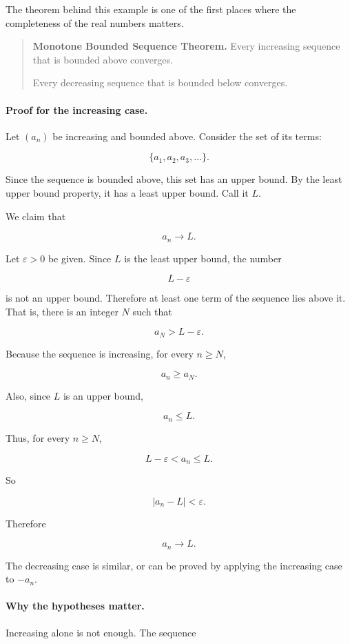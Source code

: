 The theorem behind this example is one of the first places where the completeness of the real numbers matters.

\begin{quote}
\textbf{Monotone Bounded Sequence Theorem.}
Every increasing sequence that is bounded above converges.

Every decreasing sequence that is bounded below converges.
\end{quote}

\paragraph{Proof for the increasing case.}
Let \((a_n)\) be increasing and bounded above.  Consider the set of its terms:

\[
\{a_1,a_2,a_3,\ldots\}.
\]

Since the sequence is bounded above, this set has an upper bound.  By the least upper bound property, it has a least upper bound.  Call it \(L\).

We claim that

\[
a_n\to L.
\]

Let \(\varepsilon>0\) be given.  Since \(L\) is the least upper bound, the number

\[
L-\varepsilon
\]

is not an upper bound.  Therefore at least one term of the sequence lies above it.  That is, there is an integer \(N\) such that

\[
a_N>L-\varepsilon.
\]

Because the sequence is increasing, for every \(n\ge N\),

\[
a_n\ge a_N.
\]

Also, since \(L\) is an upper bound,

\[
a_n\le L.
\]

Thus, for every \(n\ge N\),

\[
L-\varepsilon<a_n\le L.
\]

So

\[
|a_n-L|<\varepsilon.
\]

Therefore

\[
a_n\to L.
\]

The decreasing case is similar, or can be proved by applying the increasing case to \(-a_n\).

\paragraph{Why the hypotheses matter.}
Increasing alone is not enough.  The sequence


